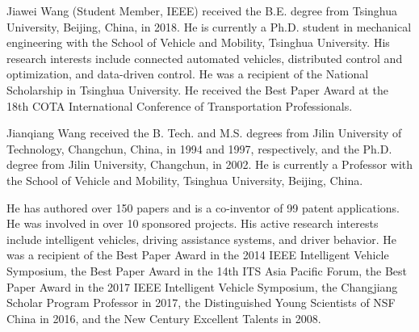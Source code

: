 \documentclass[journal]{IEEEtranTIE}
\begin{document}
\begin{IEEEbiography}
{Jiawei Wang} (Student Member, IEEE) received the B.E. degree from Tsinghua University, Beijing, China, in 2018. He is currently a Ph.D. student in mechanical engineering with the School of Vehicle and Mobility, Tsinghua University. His research interests include connected automated vehicles, distributed control and optimization, and data-driven control. He was a recipient of the National Scholarship in Tsinghua University. He received the Best Paper Award at the 18th COTA International Conference of Transportation Professionals. 
\end{IEEEbiography}

\begin{IEEEbiography}
{Jianqiang Wang} received the B. Tech. and M.S. degrees from Jilin University of Technology, Changchun, China, in 1994 and 1997, respectively, and the Ph.D. degree from Jilin University, Changchun, in 2002. He is currently a Professor with the School of Vehicle and Mobility, Tsinghua University, Beijing, China. 

He has authored over 150 papers and is a co-inventor of 99 patent applications. He was involved in over 10 sponsored projects. His active research interests include intelligent vehicles, driving assistance systems, and driver behavior. He was a recipient of the Best Paper Award in the 2014 IEEE Intelligent Vehicle Symposium, the Best Paper Award in the 14th ITS Asia Pacific Forum, the Best Paper Award in the 2017 IEEE Intelligent Vehicle Symposium, the Changjiang Scholar Program Professor in 2017, the Distinguished Young Scientists of NSF China in 2016, and the New Century Excellent Talents in 2008.
\end{IEEEbiography}
\end{document}

